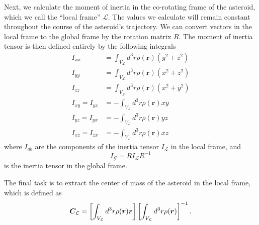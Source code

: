 \documentclass[aps,twocolumn,secnumarabic,balancelastpage,amsmath,amssymb,nofootinbib,floatfix]{revtex4-1}
\begin{document}
Next, we calculate the moment of inertia in the co-rotating frame of the asteroid, which we call the ``local frame'' $\mathcal{L}$. The values we calculate will remain constant throughout the course of the asteroid's trajectory. We can convert vectors in the local frame to the global frame by the rotation matrix $R$. The moment of inertia tensor is then defined entirely by the following integrals
\begin{equation}
\begin{aligned}
    I_{xx} &= \int_{V_\mathcal{L}} d^3 r  \rho(\bm r) (y^2 + z^2) \\
    I_{yy} &= \int_{V_\mathcal{L}} d^3 r  \rho(\bm r) (x^2 + z^2) \\
    I_{zz} &= \int_{V_\mathcal{L}} d^3 r  \rho(\bm r) (x^2 + y^2) \\
    I_{xy}=I_{yx} &= -\int_{V_\mathcal{L}} d^3r \rho(\bm r) xy \\
    I_{yz}=I_{yx} &= -\int_{V_\mathcal{L}} d^3r \rho(\bm r) yz\\
    I_{xz}=I_{zx} &= -\int_{V_\mathcal{L}} d^3r \rho(\bm r) xz
    \label{eqn:moi-local}
\end{aligned}
\end{equation}
where $I_{ab}$ are the components of the inertia tensor $I_\mathcal{L}$ in the local frame, and
\begin{equation}
    I_\mathcal{G} = R I_\mathcal{L} R^{-1}
    \label{eqn:moi-global}
\end{equation}
is the inertia tensor in the global frame.

The final task is to extract the center of mass of the asteroid in the local frame, which is defined as 
\begin{equation}
    \bm C_\mathcal{L} = \left[ \int_{V_\mathcal{L}} d^3 r \rho(\bm r)\bm r \right]\left[ \int_{V_\mathcal{L}} d^3 r \rho(\bm r) \right]^{-1}.
    \label{eqn:com}
\end{equation}
\end{document}
